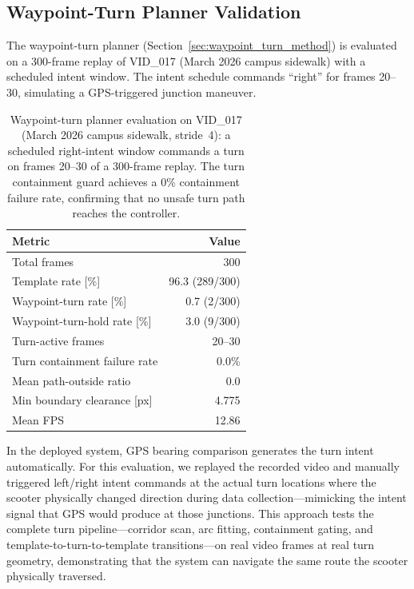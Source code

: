\documentclass[12pt,letterpaper,oneside]{report}
\begin{document}
\subsection{Waypoint-Turn Planner Validation}
\label{sec:waypoint_turn_eval}

The waypoint-turn planner (Section~\ref{sec:waypoint_turn_method}) is evaluated on a 300-frame replay of VID\_017 (March 2026 campus sidewalk) with a scheduled intent window.  The intent schedule commands ``right'' for frames 20--30, simulating a GPS-triggered junction maneuver.

\begin{table}[h]
\centering
\caption{Waypoint-turn planner evaluation on VID\_017 (March 2026 campus sidewalk, stride~4): a scheduled right-intent window commands a turn on frames 20--30 of a 300-frame replay. The turn containment guard achieves a 0\% containment failure rate, confirming that no unsafe turn path reaches the controller.}
\label{tab:waypoint_turn_eval}
\begin{tabular}{lr}
\toprule
Metric & Value \\
\midrule
Total frames                    & 300 \\
Template rate [\%]              & 96.3 (289/300) \\
Waypoint-turn rate [\%]         & 0.7 (2/300) \\
Waypoint-turn-hold rate [\%]    & 3.0 (9/300) \\
Turn-active frames              & 20--30 \\
Turn containment failure rate   & 0.0\% \\
Mean path-outside ratio         & 0.0 \\
Min boundary clearance [px]     & 4.775 \\
Mean FPS                        & 12.86 \\
\bottomrule
\end{tabular}
\end{table}

In the deployed system, GPS bearing comparison generates the turn intent automatically.  For this evaluation, we replayed the recorded video and manually triggered left/right intent commands at the actual turn locations where the scooter physically changed direction during data collection---mimicking the intent signal that GPS would produce at those junctions.  This approach tests the complete turn pipeline---corridor scan, arc fitting, containment gating, and template-to-turn-to-template transitions---on real video frames at real turn geometry, demonstrating that the system can navigate the same route the scooter physically traversed.
\end{document}
